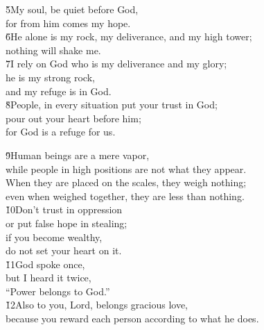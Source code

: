 \begin{poetry}
\poeml \v{5}My soul, be quiet before God, \\
\poemll    for from him comes my hope. \\
\poeml \v{6}He alone is my rock, my deliverance, and my high tower; \\
\poemll    nothing will shake me. \\
\poeml \v{7}I rely on God who is my deliverance and my glory; \\
\poemll    he is my strong rock, \\
\poemlll       and my refuge is in God. \\
\poeml \v{8}People, in every situation put your trust in God; \\
\poemll    pour out your heart before him; \\
\poemlll       for God is a refuge for us.
\end{poetry}

\begin{poetry}
\poeml \v{9}Human beings are a mere vapor, \\
\poemll    while people in high positions are not what they appear. \\
\poemll    When they are placed on the scales, they weigh nothing; \\
\poemlll       even when weighed together, they are less than nothing. \\
\poeml \v{10}Don't trust in oppression \\
\poemll    or put false hope in stealing; \\
\poeml if you become wealthy, \\
\poemll    do not set your heart on it. \\
\poeml \v{11}God spoke once, \\
\poemll    but I heard it twice, \\
\poemlll       ``Power belongs to God.'' \\
\poeml \v{12}Also to you, Lord, belongs gracious love, \\
\poemll    because you reward each person according to what he does.
\end{poetry}


